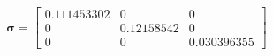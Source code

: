 $$
\boldsymbol\sigma = \left[\begin{matrix}0.111453302 & 0 & 0\\0 & 0.12158542 & 0\\0 & 0 & 0.030396355\end{matrix}\right]
$$
